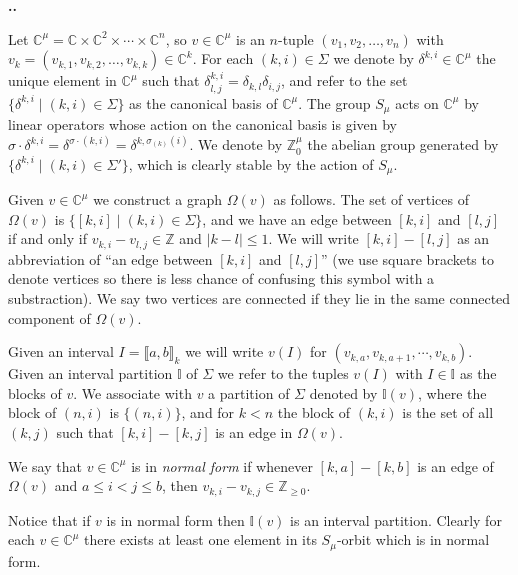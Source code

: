 \documentclass[11pt,fleqn]{amsart}
\renewcommand\thesection{\arabic{section}}
\newcounter{para}[section]
\renewcommand\thepara{\thesection.\arabic{para}}
\def\paragraph{%
 \noindent
 \refstepcounter{para}%
 \textbf{\thepara.}\hspace{1ex}%
}
\newcommand\CC{\mathbb C}
\newcommand\ZZ{\mathbb Z}
\newcommand\II{\mathbb I}
\newcommand\interval[1]{\llbracket #1 \rrbracket}
\begin{document}
\paragraph
Let $\CC^\mu = \CC \times \CC^2 \times \cdots \times \CC^n$, so $v \in \CC^\mu$
is an $n$-tuple $(v_1, v_2, \ldots, v_n)$ with $v_k = (v_{k,1}, v_{k,2},
\ldots, v_{k,k}) \in \CC^k$. For each $(k,i) \in \Sigma$ we denote by 
$\delta^{k,i} \in \CC^\mu$ the unique element in $\CC^\mu$ such that 
$\delta^{k,i}_{l,j} = \delta_{k,l} \delta_{i,j}$, and refer to the set 
$\{\delta^{k,i}\mid (k,i) \in \Sigma\}$ as the canonical basis of $\CC^\mu$. 
The group $S_\mu$ acts on $\CC^\mu$ by linear operators whose action on the 
canonical basis is given by $\sigma \cdot \delta^{k,i} = \delta^{\sigma \cdot 
(k,i)} = \delta^{k, \sigma_{(k)} (i)}$. We denote by $\ZZ^\mu_0$ the abelian 
group generated by $\{\delta^{k,i} \mid (k,i) \in \Sigma'\}$, which is 
clearly stable by the action of $S_\mu$.

Given $v \in \CC^\mu$ we construct a graph $\Omega(v)$ as follows. The set of 
vertices of $\Omega(v)$ is $\{[k,i] \mid (k,i) \in \Sigma\}$, and we have an 
edge between $[k,i]$ and $[l,j]$ if and only if $v_{k,i} - v_{l,j} \in \ZZ$ 
and $|k-l| \leq 1$. We will write $[k,i] - [l,j]$ as an abbreviation of 
``an edge between $[k,i]$ and $[l,j]$'' (we use square brackets to denote 
vertices so there is less chance of confusing this symbol with a 
substraction). We say two vertices are connected if they lie in the same 
connected component of $\Omega(v)$. 

Given an interval $I = \interval{a,b}_k$ we will write $v(I)$ for $(v_{k,a}, 
v_{k,a+1}, \cdots, v_{k,b})$. Given an interval partition $\II$ of $\Sigma$ we 
refer to the tuples $v(I)$ with $I \in \II$ as the blocks of $v$. We 
associate with $v$ a partition of $\Sigma$ denoted by $\II(v)$, where the 
block of $(n,i)$ is $\{(n,i)\}$, and for $k < n$ the block of $(k,i)$ is the 
set of all $(k,j)$ such that $[k,i] - [k,j]$ is an edge in $\Omega(v)$.

\begin{Definition}
We say that $v \in \CC^\mu$ is in \emph{normal form} if whenever $[k,a] - 
[k,b]$ is an edge of $\Omega(v)$ and $a \leq i < j \leq b$, then
$v_{k,i} - v_{k,j} \in \ZZ_{\geq 0}$. 
\end{Definition}
Notice that if $v$ is in normal form then $\II(v)$ is an interval partition.
Clearly for each $v \in \CC^\mu$ there exists at least one element in its 
$S_\mu$-orbit which is in normal form. 
\end{document}
